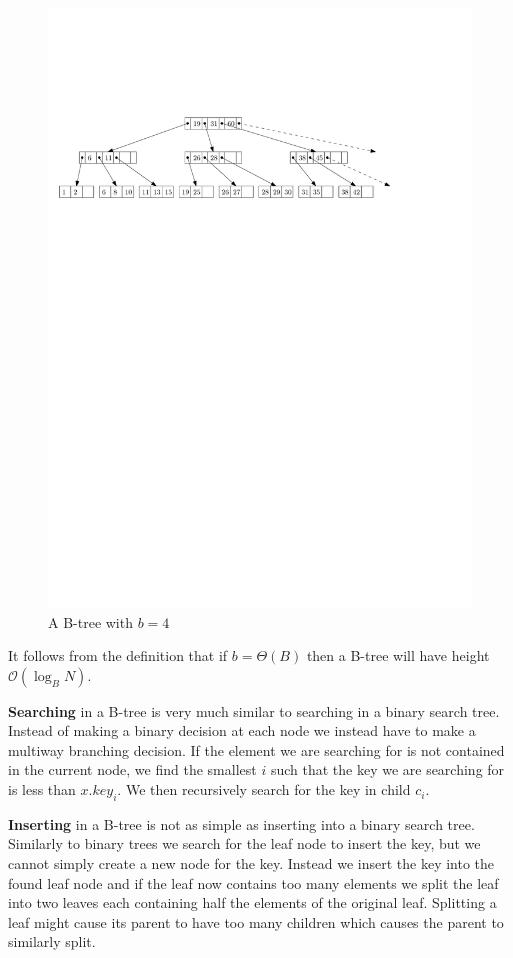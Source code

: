 \documentclass[twoside,11pt,openright]{report}
\begin{document}
\begin{figure}[h]
	\centering
	\includegraphics[width=\textwidth]{../figures/b-tree}
	\caption{A B-tree with $b = 4$}
	\label{fig:b-tree}
\end{figure}

It follows from the definition that if $b=\Theta(B)$ then a B-tree will have height $\mathcal{O}(\log_B N)$.

\textbf{Searching} in a B-tree is very much similar to searching in a binary search tree. Instead of making a binary decision at each node we instead have to make a multiway branching decision. If the element we are searching for is not contained in the current node, we find the smallest $i$ such that the key we are searching for is less than $x.key_i$. We then recursively search for the key in child $c_i$.

\textbf{Inserting} in a B-tree is not as simple as inserting into a binary search tree. Similarly to binary trees we search for the leaf node to insert the key, but we cannot simply create a new node for the key. Instead we insert the key into the found leaf node and if the leaf now contains too many elements we split the leaf into two leaves each containing half the elements of the original leaf. Splitting a leaf might cause its parent to have too many children which causes the parent to similarly split.
\end{document}
